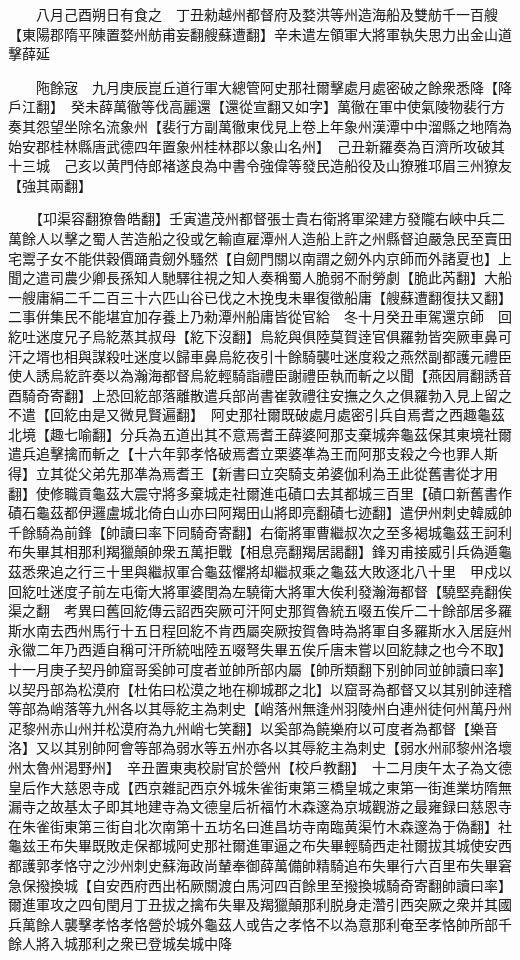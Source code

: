 　　八月己酉朔日有食之　丁丑勑越州都督府及婺洪等州造海船及雙舫千一百艘【東陽郡隋平陳置婺州舫甫妄翻艘蘇遭翻】辛未遣左領軍大將軍執失思力出金山道擊薛延

　　陁餘宼　九月庚辰崑丘道行軍大總管阿史那社爾擊處月處密破之餘衆悉降【降戶江翻】　癸未薛萬徹等伐高麗還【還從宣翻又如字】萬徹在軍中使氣陵物裴行方奏其怨望坐除名流象州【裴行方副萬徹東伐見上卷上年象州漢潭中中溜縣之地隋為始安郡桂林縣唐武德四年置象州桂林郡以象山名州】　己丑新羅奏為百濟所攻破其十三城　己亥以黄門侍郎褚遂良為中書令強偉等發民造船役及山獠雅邛眉三州獠友【強其兩翻】

　　【卭渠容翻獠魯皓翻】壬寅遣茂州都督張士貴右衛將軍梁建方發隴右峽中兵二萬餘人以擊之蜀人苦造船之役或乞輸直雇潭州人造船上許之州縣督迫嚴急民至賣田宅鬻子女不能供穀價踊貴劒外騷然【自劒門關以南謂之劒外内京師而外諸夏也】上聞之遣司農少卿長孫知人馳驛往視之知人奏稱蜀人脆弱不耐勞劇【脆此芮翻】大船一艘庸絹二千二百三十六匹山谷已伐之木挽曳未畢復徵船庸【艘蘇遭翻復扶又翻】二事倂集民不能堪宜加存養上乃勑潭州船庸皆從官給　冬十月癸丑車駕還京師　回紇吐迷度兄子烏紇蒸其叔母【紇下沒翻】烏紇與俱陸莫賀逹官俱羅勃皆突厥車鼻可汗之壻也相與謀殺吐迷度以歸車鼻烏紇夜引十餘騎襲吐迷度殺之燕然副都護元禮臣使人誘烏紇許奏以為瀚海都督烏紇輕騎詣禮臣謝禮臣執而斬之以聞【燕因肩翻誘音酉騎奇寄翻】上恐回紇部落離散遣兵部尚書崔敦禮往安撫之久之俱羅勃入見上留之不遣【回紇由是又微見賢遍翻】　阿史那社爾既破處月處密引兵自焉耆之西趣龜茲北境【趣七喻翻】分兵為五道出其不意焉耆王薛婆阿那支棄城奔龜茲保其東境社爾遣兵追擊擒而斬之【十六年郭孝恪破焉耆立栗婆凖為王而阿那支殺之今也罪人斯得】立其從父弟先那凖為焉耆王【新書曰立突騎支弟婆伽利為王此從舊書從才用翻】使修職貢龜茲大震守將多棄城走社爾進屯磧口去其都城三百里【磧口新舊書作磧石龜茲都伊邏盧城北倚白山亦曰阿羯田山將即亮翻磧七迹翻】遣伊州刺史韓威帥千餘騎為前鋒【帥讀曰率下同騎奇寄翻】右衛將軍曹繼叔次之至多褐城龜茲王訶利布失畢其相那利羯獵顛帥衆五萬拒戰【相息亮翻羯居謁翻】鋒刃甫接威引兵偽遁龜茲悉衆追之行三十里與繼叔軍合龜茲懼將却繼叔乘之龜茲大敗逐北八十里　甲戍以回紇吐迷度子前左屯衛大將軍婆閏為左驍衛大將軍大俟利發瀚海都督【驍堅堯翻俟渠之翻　考異曰舊回紇傳云詔西突厥可汗阿史那賀魯統五啜五俟斤二十餘部居多羅斯水南去西州馬行十五日程回紇不肯西屬突厥按賀魯時為將軍自多羅斯水入居庭州永徽二年乃西遁自稱可汗所統咄陸五啜弩失畢五俟斤唐末嘗以回紇隸之也今不取】　十一月庚子契丹帥窟哥奚帥可度者並帥所部内屬【帥所類翻下别帥同並帥讀曰率】以契丹部為松漠府【杜佑曰松漠之地在柳城郡之北】以窟哥為都督又以其别帥逹稽等部為峭落等九州各以其辱紇主為刺史【峭落州無逢州羽陵州白連州徒何州萬丹州疋黎州赤山州并松漠府為九州峭七笑翻】以奚部為饒樂府以可度者為都督【樂音洛】又以其别帥阿會等部為弱水等五州亦各以其辱紇主為刺史【弱水州祁黎州洛壞州太魯州渇野州】　辛丑置東夷校尉官於營州【校戶教翻】　十二月庚午太子為文德皇后作大慈恩寺成【西京雜記西京外城朱雀街東第三橋皇城之東第一街進業坊隋無漏寺之故基太子即其地建寺為文德皇后祈福竹木森邃為京城觀游之最雍録曰慈恩寺在朱雀街東第三街自北次南第十五坊名曰進昌坊寺南臨黄渠竹木森邃為于偽翻】社龜兹王布失畢既敗走保都城阿史那社爾進軍逼之布失畢輕騎西走社爾拔其城使安西都護郭孝恪守之沙州刺史蘇海政尚輦奉御薛萬備帥精騎追布失畢行六百里布失畢窘急保撥換城【自安西府西出柘厥關渡白馬河四百餘里至撥換城騎奇寄翻帥讀曰率】　爾進軍攻之四旬閏月丁丑拔之擒布失畢及羯獵顛那利脱身走濳引西突厥之衆并其國兵萬餘人襲擊孝恪孝恪營於城外龜茲人或告之孝恪不以為意那利奄至孝恪帥所部千餘人將入城那利之衆已登城矣城中降